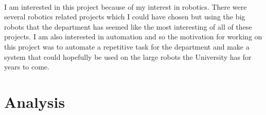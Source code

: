 \paragraph{}
I am interested in this project because of my interest in robotics. There were several robotics related projects which I could have chosen but using the big robots that the department has seemed like the most interesting of all of these projects. I am also interested in automation and so the motivation for working on this project was to automate a repetitive task for the department and make a system that could hopefully be used on the large robots the University has for years to come.


\section{Analysis}
%
%
%
